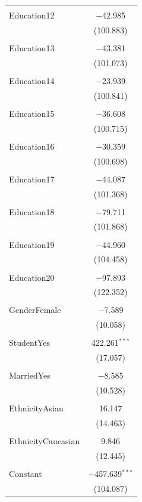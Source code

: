 \documentclass[11pt]{article}
\begin{document}
{\begin{table}[H]
{\begin{tabular}{@{\extracolsep{5pt}}lc}
  & \\ 
 Education12 & $-$42.985 \\ 
  & (100.883) \\ 
  & \\ 
 Education13 & $-$43.381 \\ 
  & (101.073) \\ 
  & \\ 
 Education14 & $-$23.939 \\ 
  & (100.841) \\ 
  & \\ 
 Education15 & $-$36.608 \\ 
  & (100.715) \\ 
  & \\ 
 Education16 & $-$30.359 \\ 
  & (100.698) \\ 
  & \\ 
 Education17 & $-$44.087 \\ 
  & (101.368) \\ 
  & \\ 
 Education18 & $-$79.711 \\ 
  & (101.868) \\ 
  & \\ 
 Education19 & $-$44.960 \\ 
  & (104.458) \\ 
  & \\ 
 Education20 & $-$97.893 \\ 
  & (122.352) \\ 
  & \\ 
 GenderFemale & $-$7.589 \\ 
  & (10.058) \\ 
  & \\ 
 StudentYes & 422.261$^{***}$ \\ 
  & (17.057) \\ 
  & \\ 
 MarriedYes & $-$8.585 \\ 
  & (10.528) \\ 
  & \\ 
 EthnicityAsian & 16.147 \\ 
  & (14.463) \\ 
  & \\ 
 EthnicityCaucasian & 9.846 \\ 
  & (12.445) \\ 
  & \\ 
 Constant & $-$457.639$^{***}$ \\ 
  & (104.087) \\ 

\end{tabular}}
\end{table}}
\end{document}
